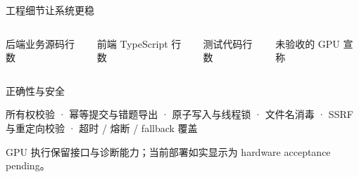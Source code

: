 \documentclass[aspectratio=169,11pt]{beamer}
\newcommand{\labeltext}[1]{{\scriptsize\color{slateMuted}\MakeUppercase{#1}}}
\begin{document}
\begin{frame}{工程细节让系统更稳}
  \vspace{3mm}
  \begin{columns}[T]
    \begin{tcolorbox}[card]\par\vspace{1mm}\scriptsize 后端业务源码行数\end{tcolorbox}
    \begin{tcolorbox}[card]\par\vspace{1mm}\scriptsize 前端 TypeScript 行数\end{tcolorbox}
    \begin{tcolorbox}[card]\par\vspace{1mm}\scriptsize 测试代码行数\end{tcolorbox}
    \begin{tcolorbox}[accent]\par\vspace{1mm}\scriptsize 未验收的 GPU 宣称\end{tcolorbox}
  \end{columns}
  \vspace{1mm}
  \begin{tcolorbox}[warm]
    \labeltext{正确性与安全}\par\vspace{1mm}\scriptsize
    所有权校验 · 幂等提交与错题导出 · 原子写入与线程锁 · 文件名消毒 · SSRF 与重定向校验 · 超时 / 熔断 / fallback 覆盖\par\vspace{2mm}
    \scriptsize GPU 执行保留接口与诊断能力；当前部署如实显示为 hardware acceptance pending。
  \end{tcolorbox}
\end{frame}
\end{document}
